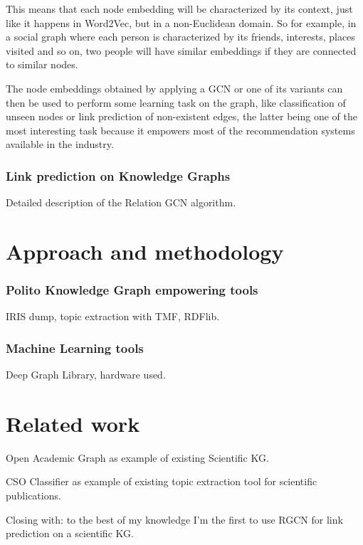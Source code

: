 \documentclass[%
    corpo=13.5pt,
    twoside,
    oldstyle,
    tipotesi=magistrale,
    greek,
    evenboxes
]{toptesi}
\begin{document}
This means that each node embedding will be characterized by its context,
just like it happens in Word2Vec, but in a non-Euclidean domain.
So for example, in a social graph where each person is characterized by its
friends, interests, places visited and so on, two people will have similar
embeddings if they are connected to similar nodes.

The node embeddings obtained by applying a GCN or one of its variants can
then be used to perform some learning task on the graph, like classification
of unseen nodes or link prediction of non-existent edges, the latter being
one of the most interesting task because it empowers most of the
recommendation systems available in the industry.


\subsection{Link prediction on Knowledge Graphs}

Detailed description of the Relation GCN algorithm.


\chapter{Approach and methodology}

\subsection{Polito Knowledge Graph empowering tools}

IRIS dump, topic extraction with TMF, RDFlib.

\subsection{Machine Learning tools}

Deep Graph Library, hardware used.

\chapter{Related work}

Open Academic Graph as example of existing Scientific KG.

CSO Classifier as example of existing topic extraction tool for scientific
publications.

Closing with: to the best of my knowledge I'm the first to use RGCN for
link prediction on a scientific KG.
\end{document}
